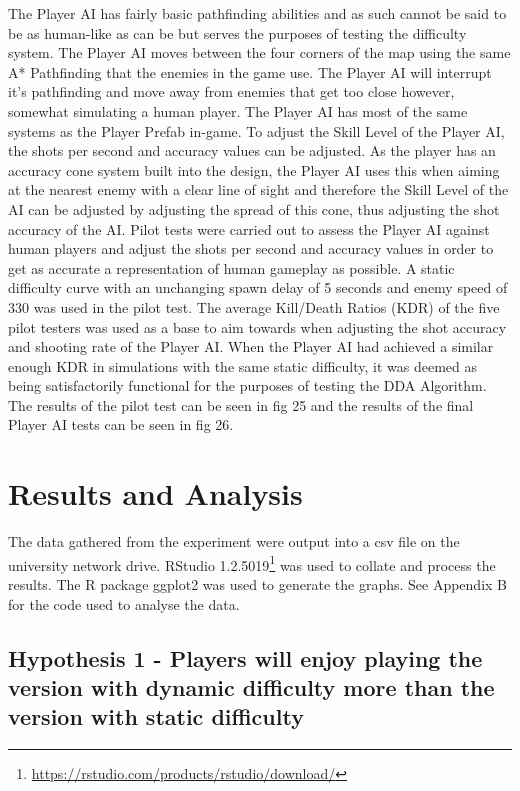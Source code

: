 \documentclass[journal]{IEEEtran}
\begin{document}
The Player AI has fairly basic pathfinding abilities and as such cannot be said to be as human-like as can be but serves the purposes of testing the difficulty system. The Player AI moves between the four corners of the map using the same A* Pathfinding that the enemies in the game use. The Player AI will interrupt it's pathfinding and move away from enemies that get too close however, somewhat simulating a human player. The Player AI has most of the same systems as the Player Prefab in-game. To adjust the Skill Level of the Player AI, the shots per second and accuracy values can be adjusted. As the player has an accuracy cone system built into the design, the Player AI uses this when aiming at the nearest enemy with a clear line of sight and therefore the Skill Level of the AI can be adjusted by adjusting the spread of this cone, thus adjusting the shot accuracy of the AI. Pilot tests were carried out to assess the Player AI against human players and adjust the shots per second and accuracy values in order to get as accurate a representation of human gameplay as possible. A static difficulty curve with an unchanging spawn delay of 5 seconds and enemy speed of 330 was used in the pilot test. The average Kill/Death Ratios (KDR) of the five pilot testers was used as a base to aim towards when adjusting the shot accuracy and shooting rate of the Player AI. When the Player AI had achieved a similar enough KDR in simulations with the same static difficulty, it was deemed as being satisfactorily functional for the purposes of testing the DDA Algorithm. The results of the pilot test can be seen in fig 25 and the results of the final Player AI tests can be seen in fig 26.

\section{Results and Analysis}

The data gathered from the experiment were output into a csv file on the university network drive. RStudio 1.2.5019\footnote{\url{https://rstudio.com/products/rstudio/download/}} was used to collate and process the results. The R package ggplot2 was used to generate the graphs. See Appendix B for the code used to analyse the data. 

\subsection{Hypothesis 1 - Players will enjoy playing the version with dynamic difficulty more than the version with static difficulty}
\end{document}
